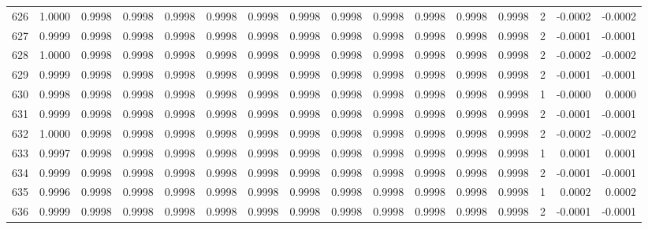 \begin{tabular}{lrrrrrrrrrrrrrrr}
626 &      1.0000 &  0.9998 &  0.9998 &  0.9998 &  0.9998 &  0.9998 &  0.9998 &  0.9998 &  0.9998 &  0.9998 &   0.9998 &     0.9998 &      2 &                   -0.0002 &                    -0.0002 \\
627 &      0.9999 &  0.9998 &  0.9998 &  0.9998 &  0.9998 &  0.9998 &  0.9998 &  0.9998 &  0.9998 &  0.9998 &   0.9998 &     0.9998 &      2 &                   -0.0001 &                    -0.0001 \\
628 &      1.0000 &  0.9998 &  0.9998 &  0.9998 &  0.9998 &  0.9998 &  0.9998 &  0.9998 &  0.9998 &  0.9998 &   0.9998 &     0.9998 &      2 &                   -0.0002 &                    -0.0002 \\
629 &      0.9999 &  0.9998 &  0.9998 &  0.9998 &  0.9998 &  0.9998 &  0.9998 &  0.9998 &  0.9998 &  0.9998 &   0.9998 &     0.9998 &      2 &                   -0.0001 &                    -0.0001 \\
630 &      0.9998 &  0.9998 &  0.9998 &  0.9998 &  0.9998 &  0.9998 &  0.9998 &  0.9998 &  0.9998 &  0.9998 &   0.9998 &     0.9998 &      1 &                   -0.0000 &                     0.0000 \\
631 &      0.9999 &  0.9998 &  0.9998 &  0.9998 &  0.9998 &  0.9998 &  0.9998 &  0.9998 &  0.9998 &  0.9998 &   0.9998 &     0.9998 &      2 &                   -0.0001 &                    -0.0001 \\
632 &      1.0000 &  0.9998 &  0.9998 &  0.9998 &  0.9998 &  0.9998 &  0.9998 &  0.9998 &  0.9998 &  0.9998 &   0.9998 &     0.9998 &      2 &                   -0.0002 &                    -0.0002 \\
633 &      0.9997 &  0.9998 &  0.9998 &  0.9998 &  0.9998 &  0.9998 &  0.9998 &  0.9998 &  0.9998 &  0.9998 &   0.9998 &     0.9998 &      1 &                    0.0001 &                     0.0001 \\
634 &      0.9999 &  0.9998 &  0.9998 &  0.9998 &  0.9998 &  0.9998 &  0.9998 &  0.9998 &  0.9998 &  0.9998 &   0.9998 &     0.9998 &      2 &                   -0.0001 &                    -0.0001 \\
635 &      0.9996 &  0.9998 &  0.9998 &  0.9998 &  0.9998 &  0.9998 &  0.9998 &  0.9998 &  0.9998 &  0.9998 &   0.9998 &     0.9998 &      1 &                    0.0002 &                     0.0002 \\
636 &      0.9999 &  0.9998 &  0.9998 &  0.9998 &  0.9998 &  0.9998 &  0.9998 &  0.9998 &  0.9998 &  0.9998 &   0.9998 &     0.9998 &      2 &                   -0.0001 &                    -0.0001 \\

\end{tabular}
